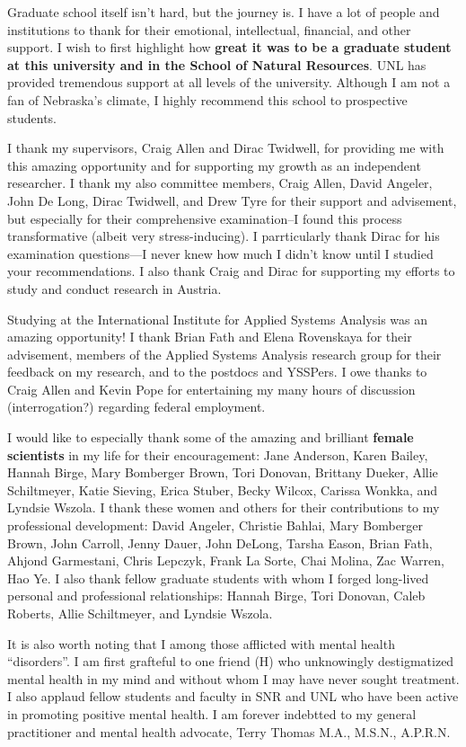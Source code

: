 \documentclass[12pt,twoside,openany]{reedthesis}
\begin{document}
Graduate school itself isn't hard, but the journey is. I have a lot of people and institutions to thank for their emotional, intellectual, financial, and other support. I wish to first highlight how \textbf{great it was to be a graduate student at this university and in the School of Natural Resources}. UNL has provided tremendous support at all levels of the university. Although I am not a fan of Nebraska's climate, I highly recommend this school to prospective students.

I thank my supervisors, Craig Allen and Dirac Twidwell, for providing me with this amazing opportunity and for supporting my growth as an independent researcher. I thank my also committee members, Craig Allen, David Angeler, John De Long, Dirac Twidwell, and Drew Tyre for their support and advisement, but especially for their comprehensive examination--I found this process transformative (albeit very stress-inducing). I parrticularly thank Dirac for his examination questions---I never knew how much I didn't know until I studied your recommendations. I also thank Craig and Dirac for supporting my efforts to study and conduct research in Austria.

Studying at the International Institute for Applied Systems Analysis was an amazing opportunity! I thank Brian Fath and Elena Rovenskaya for their advisement, members of the Applied Systems Analysis research group for their feedback on my research, and to the postdocs and YSSPers. I owe thanks to Craig Allen and Kevin Pope for entertaining my many hours of discussion (interrogation?) regarding federal employment.

I would like to especially thank some of the amazing and brilliant \textbf{female scientists} in my life for their encouragement: Jane Anderson, Karen Bailey, Hannah Birge, Mary Bomberger Brown, Tori Donovan, Brittany Dueker, Allie Schiltmeyer, Katie Sieving, Erica Stuber, Becky Wilcox, Carissa Wonkka, and Lyndsie Wszola. I thank these women and others for their contributions to my professional development: David Angeler, Christie Bahlai, Mary Bomberger Brown, John Carroll, Jenny Dauer, John DeLong, Tarsha Eason, Brian Fath, Ahjond Garmestani, Chris Lepczyk, Frank La Sorte, Chai Molina, Zac Warren, Hao Ye. I also thank fellow graduate students with whom I forged long-lived personal and professional relationships: Hannah Birge, Tori Donovan, Caleb Roberts, Allie Schiltmeyer, and Lyndsie Wszola.

It is also worth noting that I among those afflicted with mental health ``disorders''. I am first grafteful to one friend (H) who unknowingly destigmatized mental health in my mind and without whom I may have never sought treatment. I also applaud fellow students and faculty in SNR and UNL who have been active in promoting positive mental health. I am forever indebtted to my general practitioner and mental health advocate, Terry Thomas M.A., M.S.N., A.P.R.N.
\end{document}
